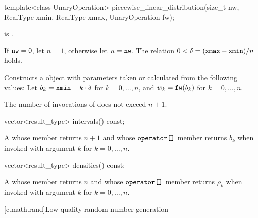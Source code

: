 %
\begin{itemdecl}
template<class UnaryOperation>
  piecewise_linear_distribution(size_t nw, RealType xmin, RealType xmax, UnaryOperation fw);
\end{itemdecl}

\begin{itemdescr}
\pnum
\mandates
{} is .

\pnum
\expects
 If $\texttt{\protect nw} = 0$, let $n = 1$, otherwise let $n = \texttt{\protect nw}$.
 The relation $0 < \delta = (\texttt{\protect xmax} - \texttt{\protect xmin}) / n$
 holds.

\pnum
\effects
Constructs a  object
 with parameters taken or calculated
 from the following values:
 Let $b_k = \texttt{\protect xmin} + k \cdot \delta$ for $k = 0, \dotsc, n$,
 and $w_k = \texttt{\protect fw}(b_k)$ for $k = 0, \dotsc, n$.

\pnum
\complexity
The number of invocations of  does not exceed $n+1$.
\end{itemdescr}

%
\begin{itemdecl}
vector<result_type> intervals() const;
\end{itemdecl}

\begin{itemdescr}
\pnum
\returns
A 
 whose  member returns $n + 1$
 and whose $ \texttt{\protect operator[]} $ member returns $b_k$
 when invoked with argument $k$ for $k = 0, \dotsc, n$.
\end{itemdescr}

%
\begin{itemdecl}
vector<result_type> densities() const;
\end{itemdecl}

\begin{itemdescr}
\pnum
\returns
A 
 whose  member returns $n$
 and whose $ \texttt{\protect operator[]} $ member returns $\rho_k$
 when invoked with argument $k$ for $k = 0, \dotsc, n$.
\end{itemdescr}%
%
%
%
%

[c.math.rand]{Low-quality random number generation}

